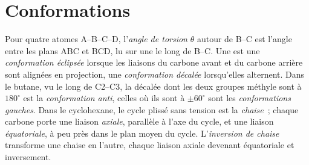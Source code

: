 \section{Conformations}

\begin{definition}\label{def:b1:stereochemistry-in-depth:conformations}
Pour quatre atomes A--B--C--D, l'\emph{angle de torsion}
$\theta$ autour de B--C est l'angle entre les plans ABC et BCD, lu sur
une  le long de B--C. Une  est une
\emph{conformation éclipsée} lorsque les liaisons du carbone avant et
du carbone arrière sont alignées en projection, une \emph{conformation
décalée} lorsqu'elles alternent. Dans le butane, vu le
long de C2--C3, la  décalée dont les deux groupes méthyle
sont à $180^\circ$ est la \emph{conformation anti},
celles où ils sont à $\pm 60^\circ$ sont les \emph{conformations
gauches}. Dans le cyclohexane, le cycle
plissé sans tension est la \emph{chaise}~; chaque carbone
porte une liaison \emph{axiale}, parallèle à l'axe du
cycle, et une liaison \emph{équatoriale}, à peu près dans le
plan moyen du cycle. L'\emph{inversion de chaise} transforme une
chaise en l'autre, chaque liaison axiale devenant équatoriale et
inversement.
\end{definition}

